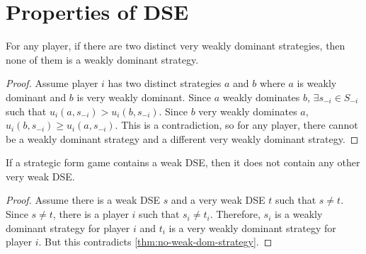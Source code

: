 \section{Properties of DSE}

\begin{lemma}
\label{thm:no-weak-dom-strategy}
For any player, if there are two distinct very weakly dominant strategies,
then none of them is a weakly dominant strategy.
\end{lemma}
\begin{proof}
Assume player $i$ has two distinct strategies $a$ and $b$
where $a$ is weakly dominant and $b$ is very weakly dominant.
Since $a$ weakly dominates $b$, $\exists s_{-i} \in S_{-i}$ such that
$u_i(a, s_{-i}) > u_i(b, s_{-i})$.
Since $b$ very weakly dominates $a$, $u_i(b, s_{-i}) \ge u_i(a, s_{-i})$.
This is a contradiction, so for any player,
there cannot be a weakly dominant strategy and a different very weakly dominant strategy.
\end{proof}

\begin{theorem}
If a strategic form game contains a weak DSE, then it does not contain
any other very weak DSE.
\end{theorem}
\begin{proof}
Assume there is a weak DSE $s$ and a very weak DSE $t$ such that $s \neq t$.
Since $s \neq t$, there is a player $i$ such that $s_i \neq t_i$.
Therefore, $s_i$ is a weakly dominant strategy for player $i$
and $t_i$ is a very weakly dominant strategy for player $i$.
But this contradicts \cref{thm:no-weak-dom-strategy}.
\end{proof}



